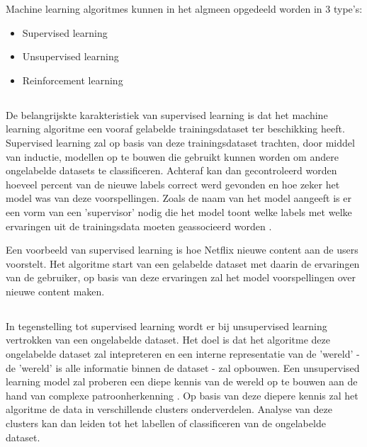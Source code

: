 Machine learning algoritmes kunnen in het algmeen opgedeeld worden in 3 type's:
\begin{itemize}
    \item Supervised learning
    \item Unsupervised learning
    \item Reinforcement learning
\end{itemize}

\subsection{}
\label{sec:supervised-learning}
De belangrijskte karakteristiek van supervised learning is dat het machine learning algoritme een vooraf gelabelde trainingsdataset ter beschikking heeft. Supervised learning zal op basis van deze trainingsdataset trachten, door middel van inductie, modellen op te bouwen die gebruikt kunnen worden om andere ongelabelde datasets te classificeren. Achteraf kan dan gecontroleerd worden hoeveel percent van de nieuwe labels correct werd gevonden en hoe zeker het model was van deze voorspellingen. Zoals de naam van het model aangeeft is er een vorm van een 'supervisor' nodig die het model toont welke labels met welke ervaringen uit de trainingsdata moeten geassocieerd worden \autocite{Cunningham2008}. 

Een voorbeeld van supervised learning is hoe Netflix nieuwe content aan de users voorstelt. Het algoritme start van een gelabelde dataset met daarin de ervaringen van de gebruiker, op basis van deze ervaringen zal het model voorspellingen over nieuwe content maken.

\subsection{}
\label{sec:unsupervised-learning}
In tegenstelling tot supervised learning wordt er bij unsupervised learning vertrokken van een ongelabelde dataset. Het doel is dat het algoritme deze ongelabelde dataset zal intepreteren en een interne representatie van de 'wereld' - de 'wereld' is alle informatie binnen de dataset - zal opbouwen. Een unsupervised learning model zal proberen een diepe kennis van de wereld op te bouwen aan de hand van complexe patroonherkenning \autocite{Hinton1999}. Op basis van deze diepere kennis zal het algoritme de data in verschillende clusters onderverdelen. Analyse van deze clusters kan dan leiden tot het labellen of classificeren van de ongelabelde dataset.

